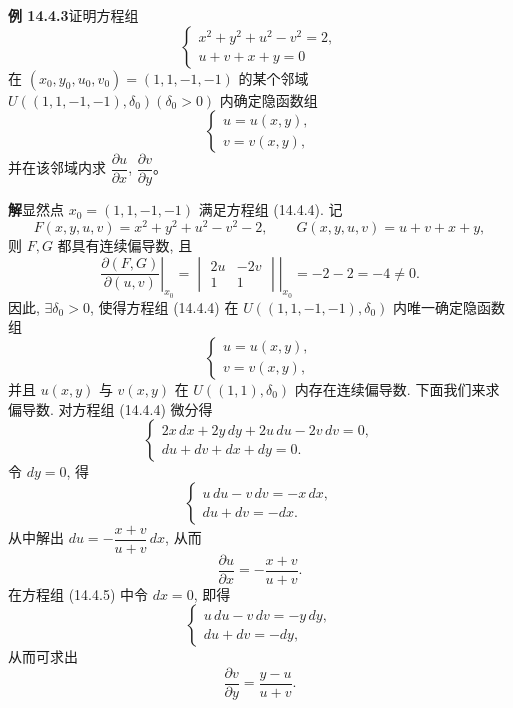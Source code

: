 \documentclass[UTF8, 12pt, fontset=fandol, oneside]{ctexart}
\begin{document}
\noindent\textbf{例 14.4.3}\quad 证明方程组
\begin{equation}
  \begin{cases}
    x^2+y^2+u^2-v^2=2,\\
    u+v+x+y=0
  \end{cases}
  \tag{14.4.4}
\end{equation}
在 $(x_0,y_0,u_0,v_0)=(1,1,-1,-1)$ 的某个邻域 $U((1,1,-1,-1),\delta_0)(\delta_0>0)$ 内确定隐函数组
\[
  \begin{cases}
    u=u(x,y),\\
    v=v(x,y),
  \end{cases}
\]
并在该邻域内求 $\dfrac{\partial u}{\partial x}$, $\dfrac{\partial v}{\partial y}$。

\noindent\textbf{解}\quad 显然点 $x_0=(1,1,-1,-1)$ 满足方程组 (14.4.4). 记
\[
  F(x,y,u,v)=x^2+y^2+u^2-v^2-2,
  \qquad
  G(x,y,u,v)=u+v+x+y,
\]
则 $F,G$ 都具有连续偏导数, 且
\[
  \left.
  \frac{\partial(F,G)}{\partial(u,v)}
  \right|_{x_0}
  =
  \left.
  \begin{vmatrix}
    2u & -2v\\
    1 & 1
  \end{vmatrix}
  \right|_{x_0}
  =-2-2=-4\ne0.
\]
因此, $\exists\delta_0>0$, 使得方程组 (14.4.4) 在 $U((1,1,-1,-1),\delta_0)$ 内唯一确定隐函数组
\[
  \begin{cases}
    u=u(x,y),\\
    v=v(x,y),
  \end{cases}
\]
并且 $u(x,y)$ 与 $v(x,y)$ 在 $U((1,1),\delta_0)$ 内存在连续偏导数. 下面我们来求偏导数. 对方程组 (14.4.4) 微分得
\begin{equation}
  \begin{cases}
    2x\,dx+2y\,dy+2u\,du-2v\,dv=0,\\
    du+dv+dx+dy=0.
  \end{cases}
  \tag{14.4.5}
\end{equation}
令 $dy=0$, 得
\[
  \begin{cases}
    u\,du-v\,dv=-x\,dx,\\
    du+dv=-dx.
  \end{cases}
\]
从中解出 $du=-\dfrac{x+v}{u+v}\,dx$, 从而
\[
  \frac{\partial u}{\partial x}=-\frac{x+v}{u+v}.
\]
在方程组 (14.4.5) 中令 $dx=0$, 即得
\[
  \begin{cases}
    u\,du-v\,dv=-y\,dy,\\
    du+dv=-dy,
  \end{cases}
\]
从而可求出
\[
  \frac{\partial v}{\partial y}=\frac{y-u}{u+v}.
\]
\end{document}
